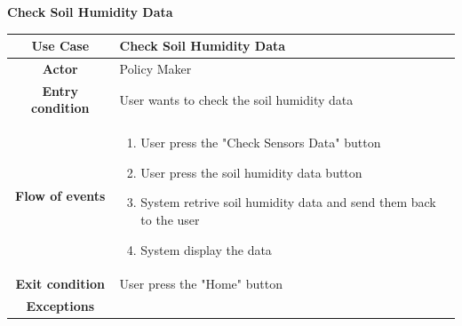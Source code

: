 \documentclass[table, 12pt]{article}
\begin{document}
\begin{itemize}
            \begin{table}[H]
                \item[] \textbf{Check Soil Humidity Data}
                \item[] 
                \centering
                \begin{tabular}{|c| m{}|}
                    \hline
                    \textbf{Use Case} & Check Soil Humidity Data\\ \hline
                    \textbf{Actor} & Policy Maker \\ \hline
                    \textbf{Entry condition} & User wants to check the soil humidity data\\  \hline
                    \textbf{Flow of events} & \begin{enumerate}
                                                \item User press the "Check Sensors Data" button
                                                \item User press the soil humidity data button
                                                \item System retrive soil humidity data and send them back to the user
                                                \item System display the data
                                            \end{enumerate}\\ \hline
                    \textbf{Exit condition} & User press the "Home" button\\ \hline
                    \textbf{Exceptions} &  \\ \hline                   
                \end{tabular}
            \end{table}


\end{itemize}
\end{document}
